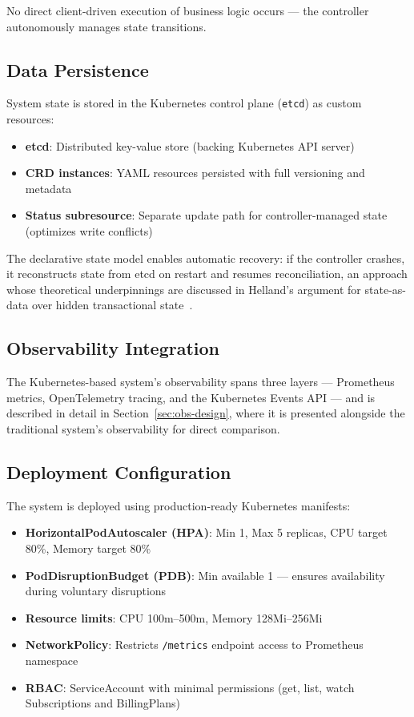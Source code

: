 No direct client-driven execution of business logic occurs --- the controller autonomously manages state transitions.

\subsection{Data Persistence}

System state is stored in the Kubernetes control plane (\texttt{etcd}) as custom resources:

\begin{itemize}
    \item \textbf{etcd}: Distributed key-value store (backing Kubernetes API server)
    \item \textbf{CRD instances}: YAML resources persisted with full versioning and metadata
    \item \textbf{Status subresource}: Separate update path for controller-managed state (optimizes write conflicts)
\end{itemize}

The declarative state model enables automatic recovery: if the controller crashes, it reconstructs state from etcd on restart and resumes reconciliation, an approach whose theoretical underpinnings are discussed in Helland's argument for state-as-data over hidden transactional state~\cite{helland2007life}.

\subsection{Observability Integration}

The Kubernetes-based system's observability spans three layers --- Prometheus metrics, OpenTelemetry tracing, and the Kubernetes Events API --- and is described in detail in Section~\ref{sec:obs-design}, where it is presented alongside the traditional system's observability for direct comparison.

\subsection{Deployment Configuration}

The system is deployed using production-ready Kubernetes manifests:

\begin{itemize}
    \item \textbf{HorizontalPodAutoscaler (HPA)}: Min 1, Max 5 replicas, CPU target 80\%, Memory target 80\%
    \item \textbf{PodDisruptionBudget (PDB)}: Min available 1 --- ensures availability during voluntary disruptions
    \item \textbf{Resource limits}: CPU 100m--500m, Memory 128Mi--256Mi
    \item \textbf{NetworkPolicy}: Restricts \texttt{/metrics} endpoint access to Prometheus namespace
    \item \textbf{RBAC}: ServiceAccount with minimal permissions (get, list, watch Subscriptions and BillingPlans)
\end{itemize}

